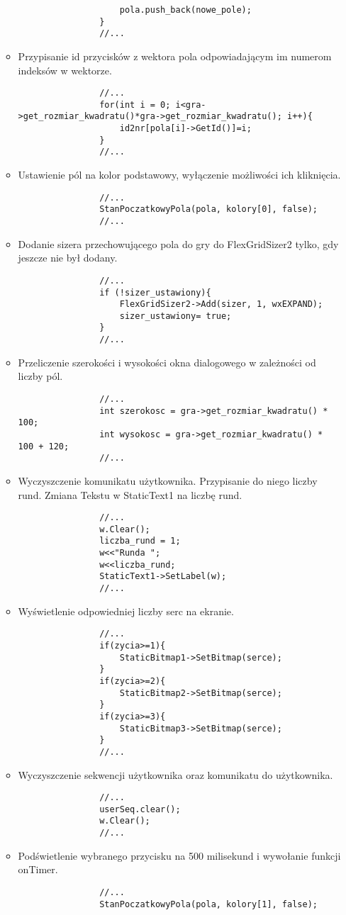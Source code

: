 \documentclass[]{report}
\begin{document}
\begin{itemize}
\begin{itemize}
\begin{lstlisting}
					pola.push_back(nowe_pole);
				}
				//...
			\end{lstlisting}
			\item Przypisanie id przycisków z wektora pola odpowiadającym im numerom indeksów w wektorze.
			\begin{lstlisting}
				//...
				for(int i = 0; i<gra->get_rozmiar_kwadratu()*gra->get_rozmiar_kwadratu(); i++){
					id2nr[pola[i]->GetId()]=i;
				}
				//...
			\end{lstlisting}
			\item Ustawienie pól na kolor podstawowy, wyłączenie możliwości ich kliknięcia.
			\begin{lstlisting}
				//...
				StanPoczatkowyPola(pola, kolory[0], false);
				//...
			\end{lstlisting}
			\item Dodanie sizera przechowującego pola do gry do FlexGridSizer2 tylko, gdy jeszcze nie był dodany.
			\begin{lstlisting}
				//...
				if (!sizer_ustawiony){
					FlexGridSizer2->Add(sizer, 1, wxEXPAND);
					sizer_ustawiony= true;
				}
				//...
			\end{lstlisting}
			\item Przeliczenie szerokości i wysokości okna dialogowego w zależności od liczby pól.
			\begin{lstlisting}
				//...
				int szerokosc = gra->get_rozmiar_kwadratu() * 100;
				int wysokosc = gra->get_rozmiar_kwadratu() * 100 + 120;
				//...
			\end{lstlisting}
			\item Wyczyszczenie komunikatu użytkownika. Przypisanie do niego liczby rund. Zmiana Tekstu w StaticText1 na liczbę rund.
			\begin{lstlisting}
				//...
				w.Clear();
				liczba_rund = 1;
				w<<"Runda ";
				w<<liczba_rund;
				StaticText1->SetLabel(w);
				//...
			\end{lstlisting}
			\item Wyświetlenie odpowiedniej liczby serc na ekranie.
			\begin{lstlisting}
				//...
				if(zycia>=1){
					StaticBitmap1->SetBitmap(serce);
				}
				if(zycia>=2){
					StaticBitmap2->SetBitmap(serce);
				}
				if(zycia>=3){
					StaticBitmap3->SetBitmap(serce);
				}
				//...
			\end{lstlisting}
			\item Wyczyszczenie sekwencji użytkownika oraz komunikatu do użytkownika.
			\begin{lstlisting}
				//...
				userSeq.clear();
				w.Clear();
				//...
			\end{lstlisting}
			\item Podświetlenie wybranego przycisku na 500 milisekund i wywołanie funkcji onTimer.
			\begin{lstlisting}
				//...
				StanPoczatkowyPola(pola, kolory[1], false);
				

\end{lstlisting}
\end{itemize}
\end{itemize}
\end{document}
